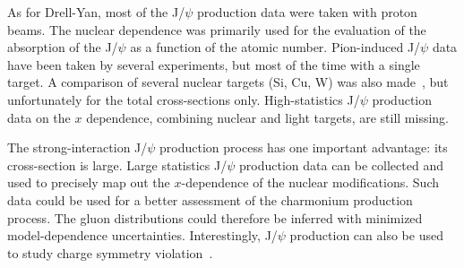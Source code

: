 As for Drell-Yan, most of the J/$\psi$ production data were taken with proton beams. The nuclear dependence  was primarily used for the evaluation of the absorption of the J/$\psi$ as a function of the atomic number.  Pion-induced J/$\psi$ data have been taken by several experiments, but most of the time with a single target.  A comparison of several nuclear targets (Si, Cu, W) was also made~\cite{Alexandrov:1999ch},   but unfortunately for the total cross-sections only. High-statistics J/$\psi$ production data on the $x$ dependence, combining nuclear and light targets, are still missing. 

The strong-interaction J/$\psi$ production process has one important advantage: its cross-section is large.  Large statistics J/$\psi$ production data can be collected and  used to precisely map out the $x$-dependence of the nuclear modifications. Such data could be  used for a better assessment of the charmonium production process.  The gluon distributions could  therefore be inferred with minimized model-dependence uncertainties. Interestingly, J/$\psi$ production can also be used to study charge symmetry violation~\cite{Piller:1995nc}. 
